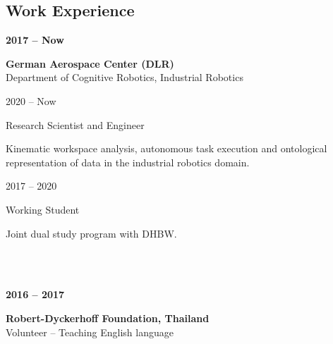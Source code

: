 \documentclass[a4paper, 10pt]{article}
\newcommand{\CVEntry}[3]{
    \begin{minipage}[t]{0.23\textwidth}
        \textbf{#1}
    \end{minipage}%
    \begin{minipage}[t]{0.76\textwidth}
        \textbf{#2}\\
        #3
    \end{minipage}%
}
\newcommand{\CVSubEntry}[2]{
    \begin{minipage}[t]{0.23\textwidth}
        \vspace{3pt}
        \hspace{8pt}#1
    \end{minipage}%
    \begin{minipage}[t]{0.76\textwidth}
        \vspace{3pt}
        #2
    \end{minipage}%
}
\begin{document}
\begin{tcbraster}[raster columns=7]
\begin{tcolorbox}[left=1cm, height=1.0\textheight, colback=white, raster multicolumn=5, boxrule=0pt, frame empty, nobeforeafter]
    \section*{Work Experience}
    \CVEntry{2017 -- Now}{German Aerospace Center (DLR)}{
        Department of Cognitive Robotics, Industrial Robotics
    }%
    \CVSubEntry{2020 -- Now}{
        Research Scientist and Engineer
        {
            \small\begin{spacing}{0.9}
            Kinematic workspace analysis, autonomous task execution and ontological representation of data in the industrial robotics domain.
            \end{spacing}%
            \vspace{2pt}
        }%
    }%
    \CVSubEntry{2017 -- 2020}{
        Working Student
        {
            \small\begin{spacing}{0.9}
            Joint dual study program with DHBW.
            \end{spacing}%
            \vspace{2pt}
        }
    }\\\\
    \CVEntry{2016 -- 2017}{Robert-Dyckerhoff Foundation, Thailand}{
        Volunteer -- Teaching English language\\
    }
    \vspace{5mm}
    \printbibliography[title=Publications]

    \vspace{5mm}

\end{tcolorbox}
\end{tcbraster}
\end{document}
